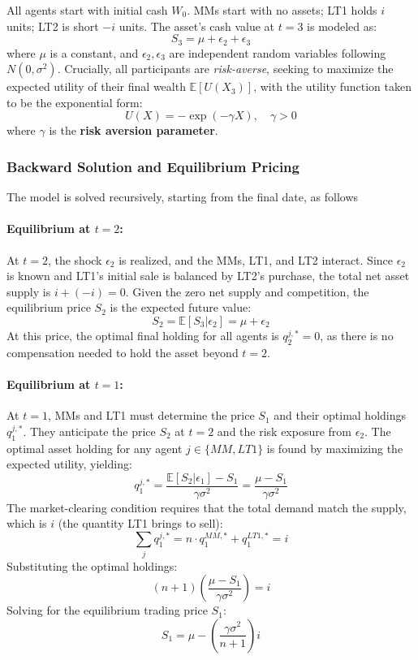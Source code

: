 All agents start with initial cash $W_0$. MMs start with no assets; LT1 holds $i$ units; LT2 is short $-i$ units. The asset's cash value at $t=3$ is modeled as:
\begin{equation}
    S_3 = \mu + \epsilon_2 + \epsilon_3
\end{equation}
where $\mu$ is a constant, and $\epsilon_2, \epsilon_3$ are independent random variables following $N(0, \sigma^2)$. Crucially, all participants are \textit{risk-averse}, seeking to maximize the expected utility of their final wealth $\mathbb{E}[U(X_3)]$, with the utility function taken to be the exponential form:
\begin{equation}
    U(X) = - \exp(-\gamma X), \quad \gamma > 0
\end{equation}
where $\gamma$ is the \textbf{risk aversion parameter}.
\subsubsection{Backward Solution and Equilibrium Pricing}

The model is solved recursively, starting from the final date, as follows

\paragraph{Equilibrium at \textbf{$t=2$:}}
At $t=2$, the shock $\epsilon_2$ is realized, and the MMs, LT1, and LT2 interact. Since $\epsilon_2$ is known and LT1's initial sale is balanced by LT2's purchase, the total net asset supply is $i + (-i) = 0$. Given the zero net supply and competition, the equilibrium price $S_2$ is the expected future value:
\begin{equation}
    S_2 = \mathbb{E}[S_3 | \epsilon_2] = \mu + \epsilon_2
\end{equation}
At this price, the optimal final holding for all agents is $q_2^{j,*} = 0$, as there is no compensation needed to hold the asset beyond $t=2$.

\paragraph{Equilibrium at \textbf{$t=1$:}}
At $t=1$, MMs and LT1 must determine the price $S_1$ and their optimal holdings $q_1^{j,*}$. They anticipate the price $S_2$ at $t=2$ and the risk exposure from $\epsilon_2$. The optimal asset holding for any agent $j \in \{MM, LT1\}$ is found by maximizing the expected utility, yielding:
\begin{equation}
    q_1^{j,*} = \frac{\mathbb{E}[S_2 | \epsilon_1] - S_1}{\gamma \sigma^2} = \frac{\mu - S_1}{\gamma \sigma^2}
\end{equation}
The market-clearing condition requires that the total demand match the supply, which is $i$ (the quantity LT1 brings to sell):
$$ \sum_{j} q_1^{j,*} = n \cdot q_1^{MM,*} + q_1^{LT1,*} = i $$
Substituting the optimal holdings:
$$ (n+1) \left( \frac{\mu - S_1}{\gamma \sigma^2} \right) = i $$
Solving for the equilibrium trading price $S_1$:
\begin{equation}
    S_1 = \mu - \left( \frac{\gamma \sigma^2}{n+1} \right) i
\end{equation}

